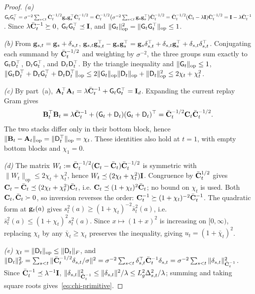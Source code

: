 \begin{proof}
\emph{(a)}
$\mathsf{G}_t\mathsf{G}_t^\top
=\sigma^{-2}\sum_{s<t}\bar{\mathbf{C}}_t^{-1/2}\mathbf{g}_s\mathbf{g}_s^\top\bar{\mathbf{C}}_t^{-1/2}
=\bar{\mathbf{C}}_t^{-1/2}\bigl(\sigma^{-2}\sum_{s<t}\mathbf{g}_s\mathbf{g}_s^\top\bigr)\bar{\mathbf{C}}_t^{-1/2}
=\bar{\mathbf{C}}_t^{-1/2}(\bar{\mathbf{C}}_t-\lambda\mathbf{I})\bar{\mathbf{C}}_t^{-1/2}
=\mathbf{I}-\lambda\bar{\mathbf{C}}_t^{-1}$.
Since $\lambda\bar{\mathbf{C}}_t^{-1}\succeq0$, $\mathsf{G}_t\mathsf{G}_t^\top\preceq\mathbf{I}$, and
$\|\mathsf{G}_t\|_{\mathrm{op}}^2=\|\mathsf{G}_t\mathsf{G}_t^\top\|_{\mathrm{op}}\le1$.

\emph{(b)}
From $\mathbf{g}_{s,t}=\mathbf{g}_s+\delta_{s,t}$,
$\mathbf{g}_{s,t}\mathbf{g}_{s,t}^\top-\mathbf{g}_s\mathbf{g}_s^\top
=\mathbf{g}_s\delta_{s,t}^\top+\delta_{s,t}\mathbf{g}_s^\top+\delta_{s,t}\delta_{s,t}^\top$.
Conjugating each summand by $\bar{\mathbf{C}}_t^{-1/2}$ and weighting by
$\sigma^{-2}$, the three groups sum exactly to
$\mathsf{G}_t\mathsf{D}_t^\top$, $\mathsf{D}_t\mathsf{G}_t^\top$, and $\mathsf{D}_t\mathsf{D}_t^\top$.
By the triangle inequality and $\|\mathsf{G}_t\|_{\mathrm{op}}\le1$,
$\|\mathsf{G}_t\mathsf{D}_t^\top+\mathsf{D}_t\mathsf{G}_t^\top+\mathsf{D}_t\mathsf{D}_t^\top\|_{\mathrm{op}}
\le 2\|\mathsf{G}_t\|_{\mathrm{op}}\|\mathsf{D}_t\|_{\mathrm{op}}+\|\mathsf{D}_t\|_{\mathrm{op}}^2
\le 2\chi_t+\chi_t^2$.

\emph{(c)}
By part~(a),
$\mathbf{A}_t^\top\mathbf{A}_t=\lambda\bar{\mathbf{C}}_t^{-1}
+\mathsf{G}_t\mathsf{G}_t^\top=\mathbf{I}_d$.  Expanding the current replay Gram gives
\[
 \mathbf{B}_t^\top\mathbf{B}_t
 =\lambda\bar{\mathbf{C}}_t^{-1}+(\mathsf{G}_t+\mathsf{D}_t)(\mathsf{G}_t+\mathsf{D}_t)^\top
 =\bar{\mathbf{C}}_t^{-1/2}\mathbf{C}_t\bar{\mathbf{C}}_t^{-1/2}.
\]
The two stacks differ only in their bottom block, hence
$\|\mathbf{B}_t-\mathbf{A}_t\|_{\rm op}=\|\mathsf{D}_t^\top\|_{\rm op}=\chi_t$.
These identities also hold at $t=1$, with empty bottom blocks and $\chi_1=0$.

\emph{(d)}
The matrix $W_t:=\bar{\mathbf{C}}_t^{-1/2}(\mathbf{C}_t-\bar{\mathbf{C}}_t)\bar{\mathbf{C}}_t^{-1/2}$ is
symmetric with $\|W_t\|_{\mathrm{op}}\le2\chi_t+\chi_t^2$, hence
$W_t\preceq(2\chi_t+\chi_t^2)\mathbf{I}$.  Congruence by $\bar{\mathbf{C}}_t^{1/2}$ gives
$\mathbf{C}_t-\bar{\mathbf{C}}_t\preceq(2\chi_t+\chi_t^2)\bar{\mathbf{C}}_t$, i.e.
$\mathbf{C}_t\preceq(1+\chi_t)^2\bar{\mathbf{C}}_t$; no bound on $\chi_t$ is used.
Both $\mathbf{C}_t,\bar{\mathbf{C}}_t\succ0$, so inversion reverses the order:
$\mathbf{C}_t^{-1}\succeq(1+\chi_t)^{-2}\bar{\mathbf{C}}_t^{-1}$.  The quadratic form at
$\mathbf{g}_t(a)$ gives $s_t^2(a)\ge(1+\chi_t)^{-2}\bar s_t^2(a)$, i.e.
$\bar s_t^2(a)\le(1+\chi_t)^2 s_t^2(a)$.  Since $x\mapsto(1+x)^2$ is
increasing on $[0,\infty)$, replacing $\chi_t$ by any $\bar\chi_t\ge\chi_t$
preserves the inequality, giving $u_t=(1+\bar\chi_t)^2$.

\emph{(e)}
$\chi_t=\|\mathsf{D}_t\|_{\mathrm{op}}\le\|\mathsf{D}_t\|_F$, and
$\|\mathsf{D}_t\|_F^2=\sum_{s<t}\|\bar{\mathbf{C}}_t^{-1/2}\delta_{s,t}/\sigma\|^2
=\sigma^{-2}\sum_{s<t}\delta_{s,t}^\top\bar{\mathbf{C}}_t^{-1}\delta_{s,t}
=\sigma^{-2}\sum_{s<t}\|\delta_{s,t}\|_{\bar{\mathbf{C}}_t^{-1}}^2$.
Since $\bar{\mathbf{C}}_t^{-1}\preceq\lambda^{-1}\mathbf{I}$,
$\|\delta_{s,t}\|_{\bar{\mathbf{C}}_t^{-1}}^2\le\|\delta_{s,t}\|^2/\lambda
\le L_g^2\Delta_{s,t}^2/\lambda$; summing and taking square roots
gives~\eqref{eq:chi-primitive}.
\end{proof}

